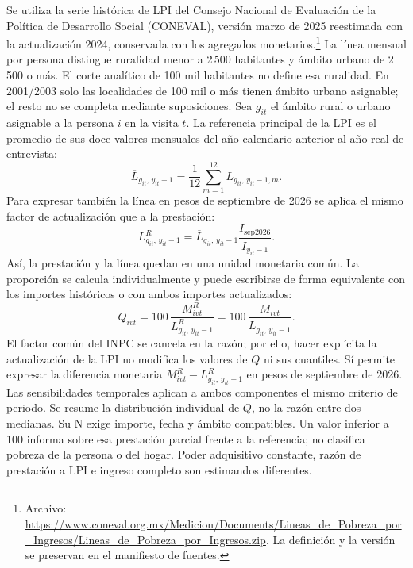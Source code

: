 Se utiliza la serie histórica de LPI del Consejo Nacional de Evaluación de la
Política de Desarrollo Social (CONEVAL), versión marzo de 2025 reestimada
con la actualización 2024, conservada con los agregados monetarios.\footnote{Archivo:
\url{https://www.coneval.org.mx/Medicion/Documents/Lineas_de_Pobreza_por_Ingresos/Lineas_de_Pobreza_por_Ingresos.zip}.
La definición y la versión se preservan en el manifiesto de fuentes.}
La línea mensual por persona distingue ruralidad menor a 2\,500 habitantes
y ámbito urbano de 2\,500 o más. El corte analítico de 100 mil habitantes
no define esa ruralidad. En 2001/2003 solo las localidades de 100 mil o más
tienen ámbito urbano asignable; el resto no se completa mediante suposiciones.
Sea $g_{it}$ el ámbito rural o urbano asignable a la persona $i$ en la visita
$t$. La referencia principal de la LPI es el promedio de sus doce valores
mensuales del año calendario anterior al año real de entrevista:
\begin{equation}
 \overline L_{g_{it},\,y_{it}-1}
 =\frac{1}{12}\sum_{m=1}^{12}L_{g_{it},\,y_{it}-1,m}.
 \label{eq:lpi-media-anual}
\end{equation}
Para expresar también la línea en pesos de septiembre de 2026 se aplica
el mismo factor de actualización que a la prestación:
\begin{equation}
 L^{R}_{g_{it},\,y_{it}-1}
 =\overline L_{g_{it},\,y_{it}-1}
 \frac{I_{\mathrm{sep2026}}}{\overline I_{y_{it}-1}}.
 \label{eq:lpi-real}
\end{equation}
Así, la prestación y la línea quedan en una unidad monetaria común. La
proporción se calcula individualmente y puede escribirse de forma equivalente
con los importes históricos o con ambos importes actualizados:
\begin{equation}
 Q_{ivt}
 =100\,\frac{M^{R}_{ivt}}{L^{R}_{g_{it},\,y_{it}-1}}
 =100\,\frac{M_{ivt}}{\overline L_{g_{it},\,y_{it}-1}}.
 \label{eq:prestacion-lpi}
\end{equation}
El factor común del INPC se cancela en la razón; por ello, hacer explícita
la actualización de la LPI no modifica los valores de $Q$ ni sus cuantiles.
Sí permite expresar la diferencia monetaria $M^{R}_{ivt}-L^{R}_{g_{it},\,y_{it}-1}$
en pesos de septiembre de 2026. Las sensibilidades temporales aplican a
ambos componentes el mismo criterio de periodo. Se resume la distribución
individual de $Q$, no la razón entre dos medianas. Su N exige importe, fecha
y ámbito compatibles. Un valor inferior a 100 informa sobre esa prestación
parcial frente a la referencia; no clasifica pobreza de la persona o del hogar.
Poder adquisitivo constante, razón de prestación a LPI e ingreso completo
son estimandos diferentes.

